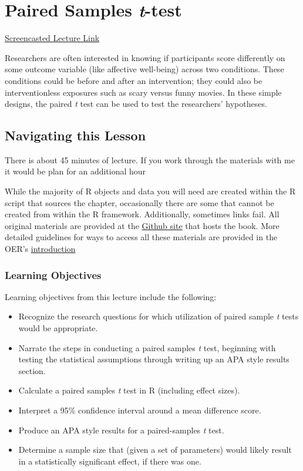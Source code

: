 \documentclass[
  11pt,
]{book}
\providecommand{\tightlist}{%
  \setlength{\itemsep}{0pt}\setlength{\parskip}{0pt}}
\begin{document}
\hypertarget{tPaired}{%
\chapter{\texorpdfstring{Paired Samples \emph{t}-test}{Paired Samples t-test}}\label{tPaired}}

\href{https://spu.hosted.panopto.com/Panopto/Pages/Viewer.aspx?pid=08a90f4e-ce0d-4a5f-93f1-af0101625dbc}{Screencasted Lecture Link}

Researchers are often interested in knowing if participants score differently on some outcome variable (like affective well-being) across two conditions. These conditions could be before and after an intervention; they could also be interventionless exposures such as scary versus funny movies. In these simple designs, the paired \emph{t} test can be used to test the researchers' hypotheses.

\hypertarget{navigating-this-lesson-4}{%
\section{Navigating this Lesson}\label{navigating-this-lesson-4}}

There is about 45 minutes of lecture. If you work through the materials with me it would be plan for an additional hour

While the majority of R objects and data you will need are created within the R script that sources the chapter, occasionally there are some that cannot be created from within the R framework. Additionally, sometimes links fail. All original materials are provided at the \href{https://github.com/lhbikos/ReCenterPsychStats}{Github site} that hosts the book. More detailed guidelines for ways to access all these materials are provided in the OER's \protect\hyperlink{ReCintro}{introduction}

\hypertarget{learning-objectives-4}{%
\subsection{Learning Objectives}\label{learning-objectives-4}}

Learning objectives from this lecture include the following:

\begin{itemize}
\tightlist
\item
  Recognize the research questions for which utilization of paired sample \emph{t} tests would be appropriate.
\item
  Narrate the steps in conducting a paired samples \emph{t} test, beginning with testing the statistical assumptions through writing up an APA style results section.
\item
  Calculate a paired samples \emph{t} test in R (including effect sizes).
\item
  Interpret a 95\% confidence interval around a mean difference score.
\item
  Produce an APA style results for a paired-samples \emph{t} test.
\item
  Determine a sample size that (given a set of parameters) would likely result in a statistically significant effect, if there was one.
\end{itemize}
\end{document}
